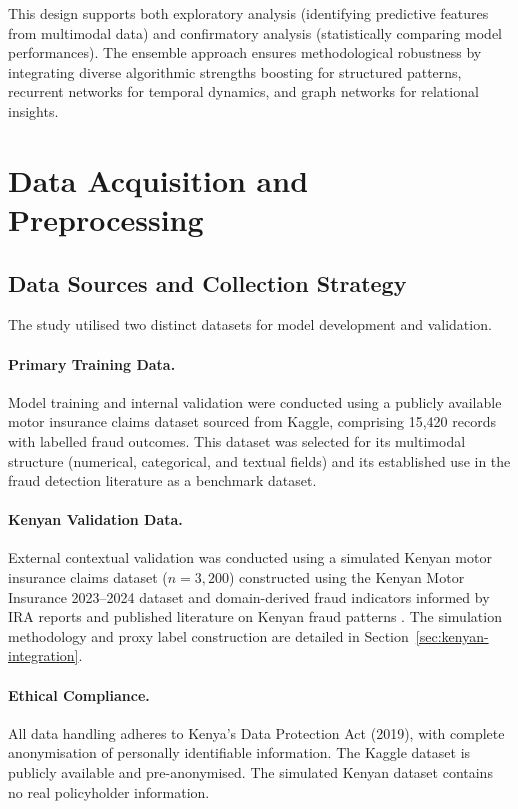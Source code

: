 \documentclass[12pt,a4paper,oneside]{report}
\numberwithin{equation}{chapter}
\begin{document}
This design supports both exploratory analysis (identifying predictive features from multimodal
data) and confirmatory analysis (statistically comparing model performances). The ensemble
approach ensures methodological robustness by integrating diverse algorithmic strengths boosting
for structured patterns, recurrent networks for temporal dynamics, and graph networks for
relational insights.

\section{Data Acquisition and Preprocessing}

\subsection{Data Sources and Collection Strategy}
\label{sec:data-sources}

The study utilised two distinct datasets for model development and validation.

\paragraph{Primary Training Data.} Model training and internal validation were conducted using a
publicly available motor insurance claims dataset sourced from Kaggle, comprising 15,420 records
with labelled fraud outcomes. This dataset was selected for its multimodal structure (numerical,
categorical, and textual fields) and its established use in the fraud detection literature as a
benchmark dataset.

\paragraph{Kenyan Validation Data.} External contextual validation was conducted using a simulated
Kenyan motor insurance claims dataset ($n = 3{,}200$) constructed using the Kenyan Motor Insurance
2023--2024 dataset and domain-derived fraud indicators informed by IRA reports and published
literature on Kenyan fraud patterns \cite{njeru2022detection}. The simulation methodology and
proxy label construction are detailed in Section~\ref{sec:kenyan-integration}.

\paragraph{Ethical Compliance.} All data handling adheres to Kenya's Data Protection Act (2019),
with complete anonymisation of personally identifiable information. The Kaggle dataset is publicly
available and pre-anonymised. The simulated Kenyan dataset contains no real policyholder information.
\end{document}
